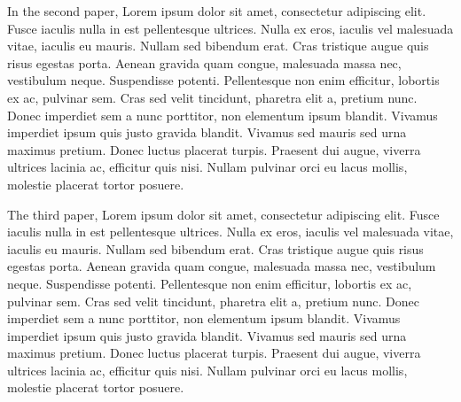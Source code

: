 In the second paper, Lorem ipsum dolor sit amet, consectetur adipiscing elit. Fusce iaculis nulla in est pellentesque ultrices. Nulla ex eros, iaculis vel malesuada vitae, iaculis eu mauris. Nullam sed bibendum erat. Cras tristique augue quis risus egestas porta. Aenean gravida quam congue, malesuada massa nec, vestibulum neque. Suspendisse potenti. Pellentesque non enim efficitur, lobortis ex ac, pulvinar sem. Cras sed velit tincidunt, pharetra elit a, pretium nunc. Donec imperdiet sem a nunc porttitor, non elementum ipsum blandit. Vivamus imperdiet ipsum quis justo gravida blandit. Vivamus sed mauris sed urna maximus pretium. Donec luctus placerat turpis. Praesent dui augue, viverra ultrices lacinia ac, efficitur quis nisi. Nullam pulvinar orci eu lacus mollis, molestie placerat tortor posuere.


The third paper, Lorem ipsum dolor sit amet, consectetur adipiscing elit. Fusce iaculis nulla in est pellentesque ultrices. Nulla ex eros, iaculis vel malesuada vitae, iaculis eu mauris. Nullam sed bibendum erat. Cras tristique augue quis risus egestas porta. Aenean gravida quam congue, malesuada massa nec, vestibulum neque. Suspendisse potenti. Pellentesque non enim efficitur, lobortis ex ac, pulvinar sem. Cras sed velit tincidunt, pharetra elit a, pretium nunc. Donec imperdiet sem a nunc porttitor, non elementum ipsum blandit. Vivamus imperdiet ipsum quis justo gravida blandit. Vivamus sed mauris sed urna maximus pretium. Donec luctus placerat turpis. Praesent dui augue, viverra ultrices lacinia ac, efficitur quis nisi. Nullam pulvinar orci eu lacus mollis, molestie placerat tortor posuere.
